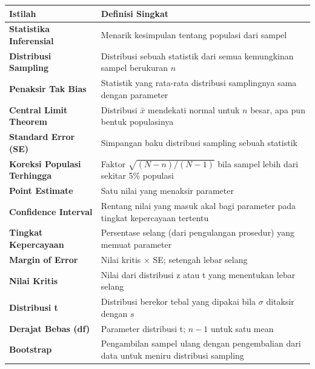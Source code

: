 \documentclass[
  indonesian,
  letterpaper,
]{book}
\newcounter{none} %
\begin{document}
{\def\LTcaptype{none} %
\begin{longtable}[]{@{}
  >{\raggedright\arraybackslash}p{}
  >{\raggedright\arraybackslash}p{}@{}}
\toprule\noalign{}
\begin{minipage}[b]{\linewidth}\raggedright
Istilah
\end{minipage} & \begin{minipage}[b]{\linewidth}\raggedright
Definisi Singkat
\end{minipage} \\
\midrule\noalign{}
\endhead
\bottomrule\noalign{}
\endlastfoot
\textbf{Statistika Inferensial} & Menarik kesimpulan tentang populasi
dari sampel \\
\textbf{Distribusi Sampling} & Distribusi sebuah statistik dari semua
kemungkinan sampel berukuran \(n\) \\
\textbf{Penaksir Tak Bias} & Statistik yang rata-rata distribusi
samplingnya sama dengan parameter \\
\textbf{Central Limit Theorem} & Distribusi \(\bar{x}\) mendekati normal
untuk \(n\) besar, apa pun bentuk populasinya \\
\textbf{Standard Error (SE)} & Simpangan baku distribusi sampling sebuah
statistik \\
\textbf{Koreksi Populasi Terhingga} & Faktor \(\sqrt{(N-n)/(N-1)}\) bila
sampel lebih dari sekitar 5\% populasi \\
\textbf{Point Estimate} & Satu nilai yang menaksir parameter \\
\textbf{Confidence Interval} & Rentang nilai yang masuk akal bagi
parameter pada tingkat kepercayaan tertentu \\
\textbf{Tingkat Kepercayaan} & Persentase selang (dari pengulangan
prosedur) yang memuat parameter \\
\textbf{Margin of Error} & Nilai kritis × SE; setengah lebar selang \\
\textbf{Nilai Kritis} & Nilai dari distribusi z atau t yang menentukan
lebar selang \\
\textbf{Distribusi t} & Distribusi berekor tebal yang dipakai bila
\(\sigma\) ditaksir dengan \(s\) \\
\textbf{Derajat Bebas (df)} & Parameter distribusi t; \(n-1\) untuk satu
mean \\
\textbf{Bootstrap} & Pengambilan sampel ulang dengan pengembalian dari
data untuk meniru distribusi sampling \\
\end{longtable}
}
\end{document}
